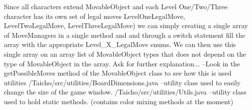Since all characters extend Movable\-Object and each Level One/\-Two/\-Three character has its own set of legal moves Level\-One\-Legal\-Move, Level\-Two\-Legal\-Move, Level\-Three\-Legal\-Move) we can simply creating a single array of Move\-Managers in a single method and and through a switch statement fill the array with the appropriate Level\-\_\-\-X\-\_\-\-Legal\-Move enums. We can then use this single array on an array list of Movable\-Object types that does not depend on the type of Movable\-Object in the array. Ask for further explanation... --Look in the get\-Possible\-Moves method of the Movable\-Object class to see how this is used utilities /\-Taicho/src/utilities/\-Board\-Dimensions.java --utility class used to easily change the size of the game window. /\-Taicho/src/utilities/\-Utils.java --utility class used to hold static methods. (contains color mixing methods at the moment) 